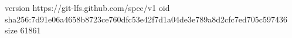version https://git-lfs.github.com/spec/v1
oid sha256:7d91e06a4658b8723ce760dfc53e42f7d1a04de3e789a8d2cfc7ed705c597436
size 61861

